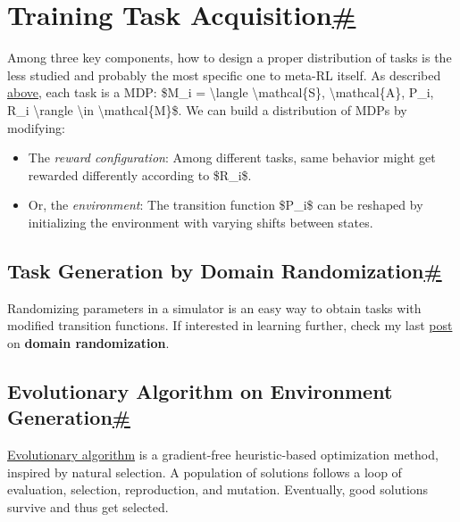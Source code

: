 \section{\texorpdfstring{Training Task Acquisition\hyperref[training-task-acquisition]{\#}}{Training Task Acquisition\#}}\label{training-task-acquisition}

Among three key components, how to design a proper distribution of tasks is the less studied and probably the most specific one to meta-RL itself. As described \hyperref[formulation]{above}, each task is a MDP: \$M\_i = \textbackslash langle \textbackslash mathcal\{S\}, \textbackslash mathcal\{A\}, P\_i, R\_i \textbackslash rangle \textbackslash in \textbackslash mathcal\{M\}\$. We can build a distribution of MDPs by modifying:

\begin{itemize}
\tightlist
\item
  The \emph{reward configuration}: Among different tasks, same behavior might get rewarded differently according to \$R\_i\$.
\item
  Or, the \emph{environment}: The transition function \$P\_i\$ can be reshaped by initializing the environment with varying shifts between states.
\end{itemize}

\subsection{\texorpdfstring{Task Generation by Domain Randomization\hyperref[task-generation-by-domain-randomization]{\#}}{Task Generation by Domain Randomization\#}}\label{task-generation-by-domain-randomization}

Randomizing parameters in a simulator is an easy way to obtain tasks with modified transition functions. If interested in learning further, check my last \href{https://lilianweng.github.io/posts/2019-05-05-domain-randomization/}{post} on \textbf{domain randomization}.

\subsection{\texorpdfstring{Evolutionary Algorithm on Environment Generation\hyperref[evolutionary-algorithm-on-environment-generation]{\#}}{Evolutionary Algorithm on Environment Generation\#}}\label{evolutionary-algorithm-on-environment-generation}

\href{https://en.wikipedia.org/wiki/Evolutionary_algorithm}{Evolutionary algorithm} is a gradient-free heuristic-based optimization method, inspired by natural selection. A population of solutions follows a loop of evaluation, selection, reproduction, and mutation. Eventually, good solutions survive and thus get selected.

